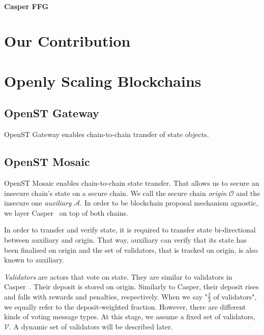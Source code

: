 \documentclass[12pt,a4paper]{article}
\newcommand{\A}{\mathcal{A}}
\newcommand{\OC}{\mathcal{O}}
\newcommand{\V}{\mathcal{V}}
\begin{document}
\paragraph{Casper FFG}
\cite{casperffg}

%
%
\section{Our Contribution}

%
%
\section{Openly Scaling Blockchains}

\subsection{OpenST Gateway}
\label{subsec:gateway}

OpenST Gateway enables chain-to-chain transfer of state objects.

\subsection{OpenST Mosaic}
\label{subsec:mosaic}

OpenST Mosaic enables chain-to-chain state transfer.
That allows us to secure an insecure chain's state on a secure chain.
We call the secure chain \emph{origin} $\OC$ and the insecure one \emph{auxiliary} $\A$.
In order to be blockchain proposal mechanism agnostic, we layer Casper~\cite{casperffg} on top of both chains.

In order to transfer and verify state, it is required to transfer state bi-directional between auxiliary and origin.
That way, auxiliary can verify that its state has been finalised on origin and
the set of validators, that is tracked on origin, is also known to auxiliary.

\emph{Validators} are actors that vote on state.
They are similar to validators in Casper~\cite{casperffg}.
Their deposit is stored on origin.
Similarly to Casper, their deposit rises and falls with rewards and penalties, respectively.
When we say "$\frac{2}{3}$ of validators", we equally refer to the deposit-weighted fraction.
However, there are different kinds of voting message types.
At this stage, we assume a fixed set of validators, $\V$.
A dynamic set of validators will be described later.
\end{document}
